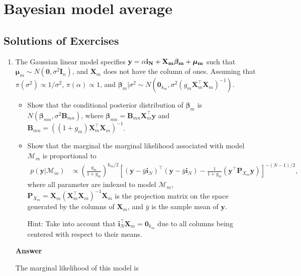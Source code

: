 \chapter{Bayesian model average}\label{chap10}

\section{Solutions of Exercises}\label{sec101}
\begin{enumerate}[leftmargin=*]

	\item The Gaussian linear model specifies $\bf{y}=\alpha\bm{i}_N+\bm{X}_m\bm{\beta}_m+\bm{\mu}_m$ such that $\bm{\mu}_m\sim{N}(\bm{0},\sigma^2\bm{I}_n)$, and $\bm{X}_m$ does not have the column of ones. Assuming that $\pi(\sigma^2)\propto 1/{\sigma^2}$, $\pi(\alpha)\propto 1$, and $\bm{\beta}_m|\sigma^2 \sim {N}(\bm{0}_{k_m}, \sigma^2 (g_m\bm{X}_m^{\top}\bm{X}_m)^{-1})$.
\begin{itemize}
	\item Show that the conditional posterior distribution of $\bm{\beta}_m$ is $N(\bm{\beta}_{mn},\sigma^2\bm{B}_{mn})$, where $\bm{\beta}_{mn}=\bm{B}_{mn}\bm{X}_m^{\top}\bm{y}$ and $\bm{B}_{mn}=((1+g_m)\bm{X}_m^{\top}\bm{X}_m)^{-1}$.
	\item Show that the marginal the marginal likelihood associated with model $\mathcal{M}_m$ is proportional to
	\begin{align*}
		p(\bm{y}|\mathcal{M}_m)&\propto \left(\frac{g_m}{1+g_m}\right)^{k_m/2} \left[(\bm{y}-\bar{y}\bm{i}_N)^{\top}(\bm{y}-\bar{y}\bm{i}_N)-\frac{1}{1+g_m}(\bm{y}^{\top}\bm{P}_{X_m}\bm{y})\right]^{-(N-1)/2},
	\end{align*}
	where all parameter are indexed to model $\mathcal{M}_m$, $\bm{P}_{X_m}=\bm{X}_m(\bm{X}_m^{\top}\bm{X}_m)^{-1}\bm{X}_m$ is the projection matrix on the space generated by the columns of $\bm{X}_m$, and $\bar{y}$ is the sample mean of $\bm{y}$.
	
	Hint: Take into account that $\bm{i}_N^{\top}\bm{X}_m=\bm{0}_{k_m}$ due to all columns being centered with respect to their means.
\end{itemize}
\textbf{Answer}

The marginal likelihood of this model is


\end{enumerate}
